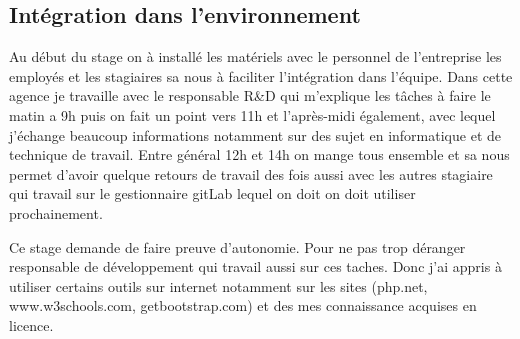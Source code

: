 \subsection{Intégration dans l’environnement}
Au début du stage on à installé les matériels avec le personnel de l'entreprise les employés et les stagiaires sa nous à faciliter l'intégration dans l'équipe.
Dans cette agence je travaille avec le responsable R\&D qui m'explique les tâches à faire le matin a 9h puis on fait un point vers 11h et l'après-midi également, avec lequel j'échange beaucoup informations notamment sur des sujet en informatique et de technique de travail.
Entre général 12h et 14h on mange tous ensemble et sa nous permet d'avoir quelque retours de travail des fois aussi avec les autres stagiaire qui travail sur le gestionnaire gitLab lequel on doit on doit utiliser prochainement.

Ce stage demande de faire preuve d'autonomie. Pour ne pas trop déranger responsable de développement qui travail aussi sur ces taches. Donc j'ai appris à utiliser certains outils sur internet notamment sur les sites (php.net, www.w3schools.com, getbootstrap.com) et des mes connaissance acquises en licence. 
